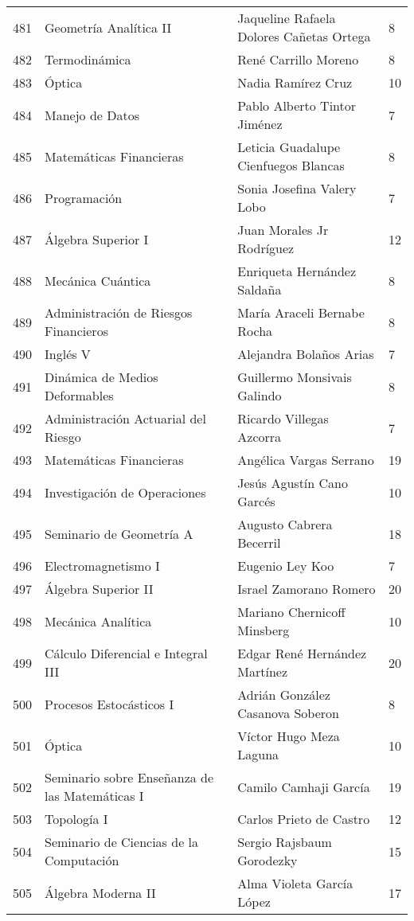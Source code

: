 \begin{table}[ht]
\begin{tabular}{rlll}
  481 & Geometría Analítica II & Jaqueline Rafaela Dolores Cañetas Ortega & 8 \\ 
  482 & Termodinámica & René Carrillo Moreno & 8 \\ 
  483 & Óptica & Nadia Ramírez Cruz & 10 \\ 
  484 & Manejo de Datos & Pablo Alberto Tintor Jiménez & 7 \\ 
  485 & Matemáticas Financieras & Leticia Guadalupe Cienfuegos Blancas & 8 \\ 
  486 & Programación & Sonia Josefina Valery Lobo & 7 \\ 
  487 & Álgebra Superior I & Juan Morales Jr Rodríguez & 12 \\ 
  488 & Mecánica Cuántica & Enriqueta Hernández Saldaña & 8 \\ 
  489 & Administración de Riesgos Financieros & María Araceli Bernabe Rocha & 8 \\ 
  490 & Inglés V & Alejandra Bolaños Arias & 7 \\ 
  491 & Dinámica de Medios Deformables & Guillermo Monsivais Galindo & 8 \\ 
  492 & Administración Actuarial del Riesgo & Ricardo Villegas Azcorra & 7 \\ 
  493 & Matemáticas Financieras & Angélica Vargas Serrano & 19 \\ 
  494 & Investigación de Operaciones & Jesús Agustín Cano Garcés & 10 \\ 
  495 & Seminario de Geometría A & Augusto Cabrera Becerril & 18 \\ 
  496 & Electromagnetismo I & Eugenio Ley Koo & 7 \\ 
  497 & Álgebra Superior II & Israel Zamorano Romero & 20 \\ 
  498 & Mecánica Analítica & Mariano Chernicoff Minsberg & 10 \\ 
  499 & Cálculo Diferencial e Integral III & Edgar René Hernández Martínez & 20 \\ 
  500 & Procesos Estocásticos I & Adrián González Casanova Soberon & 8 \\ 
  501 & Óptica & Víctor Hugo Meza Laguna & 10 \\ 
  502 & Seminario sobre Enseñanza de las Matemáticas I & Camilo Camhaji García & 19 \\ 
  503 & Topología I & Carlos Prieto de Castro & 12 \\ 
  504 & Seminario de Ciencias de la Computación & Sergio Rajsbaum Gorodezky & 15 \\ 
  505 & Álgebra Moderna II & Alma Violeta García López & 17 \\ 

\end{tabular}
\end{table}
